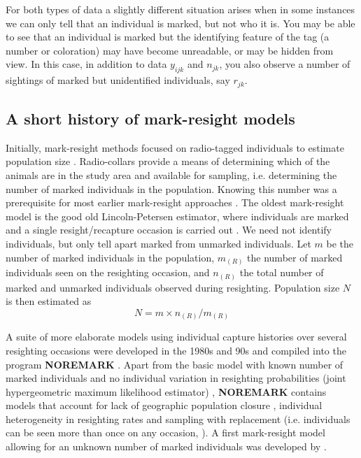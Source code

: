 
For both types of data a slightly different situation arises when in
some instances we can only tell that an individual is marked, but not
who it is. You may be able to see that an individual is marked but the
identifying feature of the tag (a number or coloration) may have
become unreadable, or may be hidden from view. In this case, in
addition to data $y_{ijk}$ and $n_{jk}$, you also observe a number of
sightings of marked but unidentified individuals, say $r_{jk}$.

\subsection{A short history of mark-resight models}

Initially, mark-resight methods focused on radio-tagged individuals to
estimate population size \citep{white_shenk:2001}. Radio-collars
provide a means of
determining
which of the animals are in the study
area and available for sampling, i.e. determining the number of marked
individuals in the population. Knowing this number was a prerequisite
for most earlier mark-resight approaches \citep{white:1996}. The
oldest mark-resight model is the good old Lincoln-Petersen estimator,
 where individuals are marked and a single resight/recapture occasion
 is carried out \citep{krebs:1999}. We need not identify individuals,
 but only tell apart marked from unmarked individuals. Let $m$ be the
 number of marked individuals in the population, $m_{(R)}$ the number
 of marked individuals seen on the resighting occasion, and $n_{(R)}$
 the total number of marked and unmarked individuals observed during
 resighting. Population size $N$ is then estimated as
\[
N = m \times n_{(R)}/m_{(R)}
\]

A suite of more elaborate models using individual capture histories
over several resighting occasions were developed in the 1980s and
90s and compiled into the program \textbf{NOREMARK} \citep{white:1996}. Apart
from the basic model with known number of marked individuals and no
individual variation in resighting probabilities (joint hypergeometric
maximum likelihood estimator) \citep{bartmann_etal:1987,
  white_garrot:1990, neal:1990, neal_etal:1993}, \textbf{NOREMARK} contains
models that account for lack of geographic population closure
\citep{neal_etal:1993}, individual heterogeneity in resighting rates
and sampling with replacement (i.e. individuals can be seen more than
once on any occasion, \citep{minta_mangel:1989, bowden:1993}). A first
mark-resight model allowing for an unknown number of marked
individuals was developed by \citet{arnason_etal:1991}.

